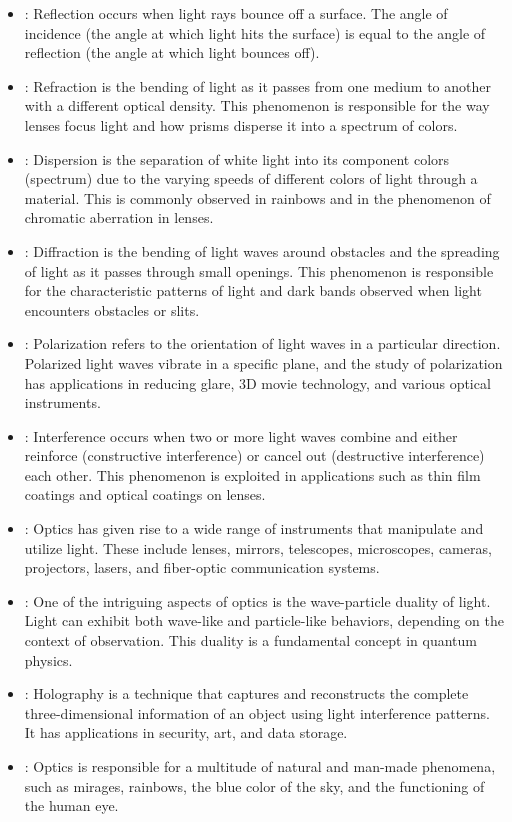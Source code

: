 \begin{itemize}
    \item {}: Reflection occurs when light rays bounce off a surface. The angle of incidence (the angle at which light hits the surface) is equal to the angle of reflection (the angle at which light bounces off).
    \item {}: Refraction is the bending of light as it passes from one medium to another with a different optical density. This phenomenon is responsible for the way lenses focus light and how prisms disperse it into a spectrum of colors.
    \item {}: Dispersion is the separation of white light into its component colors (spectrum) due to the varying speeds of different colors of light through a material. This is commonly observed in rainbows and in the phenomenon of chromatic aberration in lenses.
    \item {}: Diffraction is the bending of light waves around obstacles and the spreading of light as it passes through small openings. This phenomenon is responsible for the characteristic patterns of light and dark bands observed when light encounters obstacles or slits.
    \item {}: Polarization refers to the orientation of light waves in a particular direction. Polarized light waves vibrate in a specific plane, and the study of polarization has applications in reducing glare, 3D movie technology, and various optical instruments.
    \item {}: Interference occurs when two or more light waves combine and either reinforce (constructive interference) or cancel out (destructive interference) each other. This phenomenon is exploited in applications such as thin film coatings and optical coatings on lenses.
    \item {}: Optics has given rise to a wide range of instruments that manipulate and utilize light. These include lenses, mirrors, telescopes, microscopes, cameras, projectors, lasers, and fiber-optic communication systems.
    \item {}: One of the intriguing aspects of optics is the wave-particle duality of light. Light can exhibit both wave-like and particle-like behaviors, depending on the context of observation. This duality is a fundamental concept in quantum physics.
    \item {}: Holography is a technique that captures and reconstructs the complete three-dimensional information of an object using light interference patterns. It has applications in security, art, and data storage.
    \item {}: Optics is responsible for a multitude of natural and man-made phenomena, such as mirages, rainbows, the blue color of the sky, and the functioning of the human eye.
\end{itemize}
